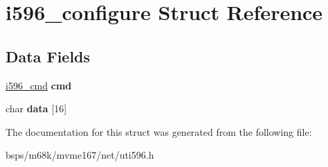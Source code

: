 \hypertarget{structi596__configure}{}\section{i596\+\_\+configure Struct Reference}
\label{structi596__configure}
\subsection*{Data Fields}
\begin{DoxyCompactItemize}
\item 
\mbox{\label{structi596__configure_a60c2f6b487c9056d6c4f0e9671c1cb2e}} 
\mbox{\hyperlink{structi596__cmd}{i596\+\_\+cmd}} {\bfseries cmd}
\item 
\mbox{\label{structi596__configure_a9693380abbef7e34315db96c3c1c66fb}} 
char {\bfseries data} \mbox{[}16\mbox{]}
\end{DoxyCompactItemize}


The documentation for this struct was generated from the following file\+:\begin{DoxyCompactItemize}
\item 
bsps/m68k/mvme167/net/uti596.\+h\end{DoxyCompactItemize}
